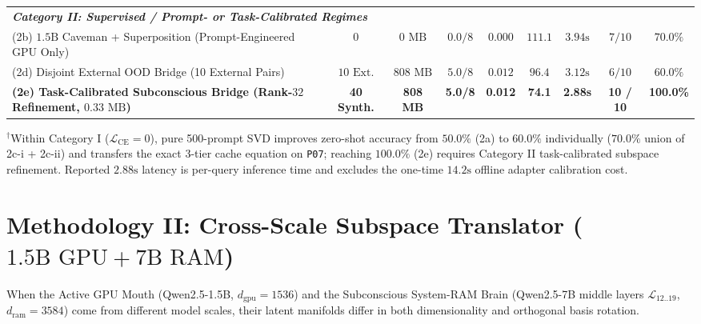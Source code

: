 \documentclass[10pt,twocolumn]{article}
\begin{document}
\begin{table}[t]
{\begin{tabular}{lcccccccc}
\midrule
\multicolumn{9}{l}{\textit{\textbf{Category II: Supervised / Prompt- or Task-Calibrated Regimes}}} \\
(2b) $1.5\text{B}$ Caveman + Superposition (Prompt-Engineered GPU Only) & $0$ & $0\text{ MB}$ & $0.0/8$ & $0.000$ & $111.1$ & $3.94\text{s}$ & $7 / 10$ & $70.0\%$ \\
(2d) Disjoint External OOD Bridge (10 External Pairs) & $10\text{ Ext.}$ & $808\text{ MB}$ & $5.0/8$ & $0.012$ & $96.4$ & $3.12\text{s}$ & $6 / 10$ & $60.0\%$ \\
\textbf{(2e) Task-Calibrated Subconscious Bridge (Rank-$32$ Refinement, $0.33\text{ MB}$)} & \textbf{40 Synth.} & \textbf{808 MB} & \textbf{5.0/8} & \textbf{0.012} & \textbf{74.1} & \textbf{2.88s} & \textbf{10 / 10} & \textbf{100.0\%} \\
\bottomrule
\end{tabular}%
}
\vspace{2pt}\par
{\footnotesize $^\dagger$Within Category I ($\mathcal{L}_{\text{CE}}=0$), pure 500-prompt SVD improves zero-shot accuracy from $50.0\%$ (2a) to $60.0\%$ individually ($70.0\%$ union of 2c-i + 2c-ii) and transfers the exact 3-tier cache equation on \texttt{P07}; reaching $100.0\%$ (2e) requires Category II task-calibrated subspace refinement. Reported $2.88\text{s}$ latency is per-query inference time and excludes the one-time $14.2\text{s}$ offline adapter calibration cost.}
\end{table}

\section{Methodology II: Cross-Scale Subspace Translator ($1.5\text{B GPU} + 7\text{B RAM}$)}
\label{sec:method2}
When the Active GPU Mouth (Qwen2.5-1.5B, $d_{\text{gpu}} = 1536$) and the Subconscious System-RAM Brain (Qwen2.5-7B middle layers $\mathcal{L}_{12..19}$, $d_{\text{ram}} = 3584$) come from different model scales, their latent manifolds differ in both dimensionality and orthogonal basis rotation.
\end{document}
